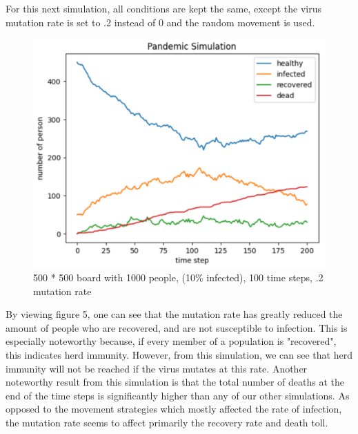 \documentclass{article}
\begin{document}
For this next simulation, all conditions are kept the same, except the virus mutation rate is set to .2 instead of 0 and the random movement is used. 
\begin{figure}[H]
    \centering
    \includegraphics[width=.6\linewidth]{figure5.png}
    \caption{500 * 500 board with 1000 people, (10\% infected), 100 time steps, .2 mutation rate}
    \label{fig:enter-label}
\end{figure}
By viewing figure 5, one can see that the mutation rate has greatly reduced the amount of people who are recovered, and are not susceptible to infection. This is especially noteworthy because, if every member of a population is "recovered", this indicates herd immunity. However, from this simulation, we can see that herd immunity will not be reached if the virus mutates at this rate. Another noteworthy result from this simulation is that the total number of deaths at the end of the time steps is significantly higher than any of our other simulations. As opposed to the movement strategies which mostly affected the rate of infection, the mutation rate seems to affect primarily the recovery rate and death toll. \\\\
\end{document}
